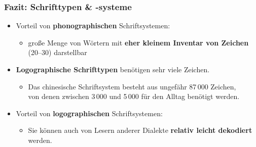 \begin{frame}
\frametitle{Fazit: Schrifttypen \& -systeme}

\begin{itemize}
	\item Vorteil von \textbf{phonographischen} Schriftsystemen:
	
	\begin{itemize}
		\item große Menge von Wörtern mit \textbf{eher kleinem Inventar von Zeichen} (20--30) darstellbar
	\end{itemize}
	
	\item \textbf{Logographische Schrifttypen} benötigen sehr viele Zeichen.
	
	\begin{itemize}
		\item Das chinesische Schriftsystem besteht aus ungefähr 87\,000 Zeichen,\\
                  von denen zwischen 3\,000 und 5\,000 für den Alltag benötigt werden.
	\end{itemize}
	
\pause 	

	\item Vorteil von \textbf{logographischen} Schriftsystemen:
	\begin{itemize}
		\item Sie können auch von Lesern anderer Dialekte \textbf{relativ leicht dekodiert} werden.
	\end{itemize}	
\end{itemize}
\end{frame}


%
%
%
%
%
